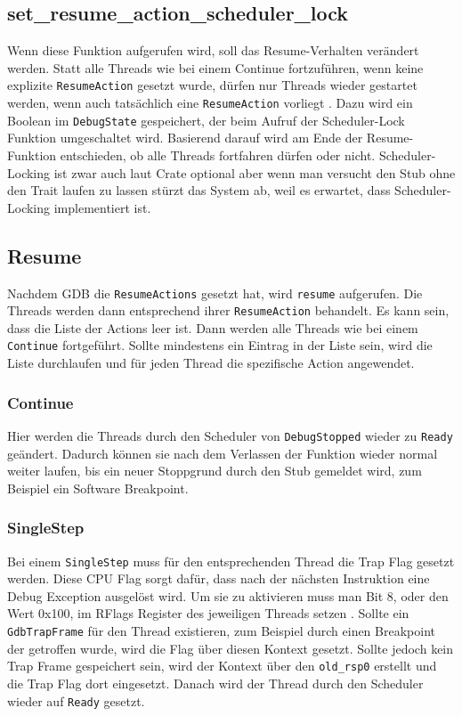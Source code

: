 \subsection{set\_resume\_action\_scheduler\_lock}
Wenn diese Funktion aufgerufen wird, soll das Resume-Verhalten verändert werden. Statt alle Threads wie bei einem Continue fortzuführen, wenn keine explizite \texttt{ResumeAction} gesetzt wurde, dürfen nur Threads wieder gestartet werden, wenn auch tatsächlich eine \texttt{ResumeAction} vorliegt \cite{gdbstub}. Dazu wird ein Boolean im \texttt{DebugState} gespeichert, der beim Aufruf der Scheduler-Lock Funktion umgeschaltet wird. Basierend darauf wird am Ende der Resume-Funktion entschieden, ob alle Threads fortfahren dürfen oder nicht. Scheduler-Locking ist zwar auch laut Crate optional aber wenn man versucht den Stub ohne den Trait laufen zu lassen stürzt das System ab, weil es erwartet, dass Scheduler-Locking implementiert ist.

\subsection{Resume}
Nachdem GDB die \texttt{ResumeActions} gesetzt hat, wird \texttt{resume} aufgerufen. Die Threads werden dann entsprechend ihrer \texttt{ResumeAction} behandelt. Es kann sein, dass die Liste der Actions leer ist. Dann werden alle Threads wie bei einem \texttt{Continue} fortgeführt. Sollte mindestens ein Eintrag in der Liste sein, wird die Liste durchlaufen und für jeden Thread die spezifische Action angewendet.

\subsubsection{Continue}
Hier werden die Threads durch den Scheduler von \texttt{DebugStopped} wieder zu \texttt{Ready} geändert. Dadurch können sie nach dem Verlassen der Funktion wieder normal weiter laufen, bis ein neuer Stoppgrund durch den Stub gemeldet wird, zum Beispiel ein Software Breakpoint.

\subsubsection{SingleStep}
Bei einem \texttt{SingleStep} muss für den entsprechenden Thread die Trap Flag gesetzt werden. Diese CPU Flag sorgt dafür, dass nach der nächsten Instruktion eine Debug Exception ausgelöst wird. Um sie zu aktivieren muss man Bit 8, oder den Wert 0x100, im RFlags Register des jeweiligen Threads setzen \cite{intel-sdm}. Sollte ein \texttt{GdbTrapFrame} für den Thread existieren, zum Beispiel durch einen Breakpoint der getroffen wurde, wird die Flag über diesen Kontext gesetzt. Sollte jedoch kein Trap Frame gespeichert sein, wird der Kontext über den \texttt{old\_rsp0} erstellt und die Trap Flag dort eingesetzt. Danach wird der Thread durch den Scheduler wieder auf \texttt{Ready} gesetzt.

